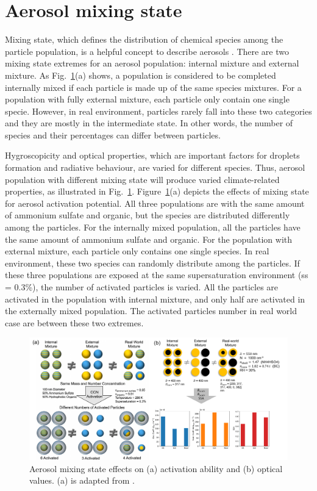 \documentclass[edeposit,fullpage]{uiucthesis2009}
\begin{document}
\section{Aerosol mixing state}
Mixing state, which defines the distribution of chemical species among the particle population, is a helpful concept to describe aerosols \citep{winkler1973growth}. There are two mixing state extremes for an aerosol population: internal mixture and external mixture. As Fig.~\ref{fig:chap1-chi-climate}(a) shows, a population is considered to be completed internally mixed if each particle is made up of the same species mixtures. For a population with fully external mixture, each particle only contain one single specie. However, in real environment, particles rarely fall into these two categories and they are mostly in the intermediate state. In other words, the number of species and their percentages can differ between particles.

Hygroscopicity and optical properties, which are important factors for droplets formation and radiative behaviour, are varied for different species. Thus, aerosol population with different mixing state will produce varied climate-related properties, as illustrated in Fig.~\ref{fig:chap1-chi-climate}. Figure~\ref{fig:chap1-chi-climate}(a) depicts the effects of mixing state for aerosol activation potential. All three populations are with the same amount of ammonium sulfate and organic, but the species are distributed differently among the particles. For the internally mixed population, all the particles have the same amount of ammonium sulfate and organic. For the population with external mixture, each particle only contains one single species. In real environment, these two species can randomly distribute among the particles. If these three populations are exposed at the same supersaturation environment (ss = 0.3\%), the number of activated particles is varied. All the particles are activated in the population with internal mixture, and only half are activated in the externally mixed population. The activated particles number in real world case are between these two extremes. 

\begin{figure}
	\centering
	\includegraphics[scale=0.60]{chap1_figs/thesis_chap1_fig3.pdf}
	\caption{Aerosol mixing state effects on (a) activation ability and (b) optical values. (a) is adapted from \citet{Riemer2019}.}
	\label{fig:chap1-chi-climate}
\end{figure}
\end{document}

